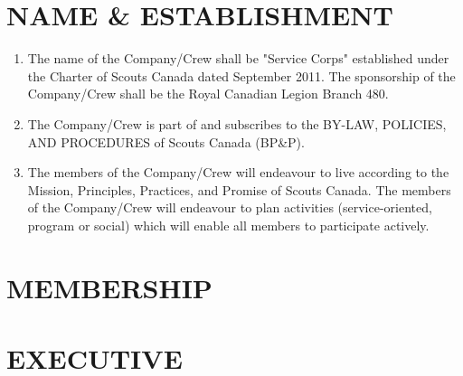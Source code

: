\documentclass{Service_Corps_Document}
\begin{document}
    \def \Title {Constitution}
    \def \Company {Service Corps}
    \def \versionNumber {4.2}
    \stdFooter
    \begin{titlepage}
        \stdTitlePage
    \end{titlepage}

    \tableofcontents

    \newpage


    \section{NAME \& ESTABLISHMENT}\label{sec:name-&-establishment}
    \begin{enumerate}
        \item The name of the Company/Crew shall be "Service Corps" established under the Charter of Scouts Canada dated September 2011.
        The sponsorship of the Company/Crew shall be the Royal Canadian Legion Branch 480.
        \item The Company/Crew is part of and subscribes to the BY-LAW, POLICIES, AND PROCEDURES of Scouts Canada (BP\&P).
        \item The members of the Company/Crew will endeavour to live according to the Mission, Principles, Practices, and Promise of Scouts Canada.
        The members of the Company/Crew will endeavour to plan activities (service-oriented, program or social) which will enable all members to participate actively.
    \end{enumerate}


    \section{MEMBERSHIP}\label{sec:membership}
    


    \section{EXECUTIVE}\label{sec:executive}
    
\end{document}
